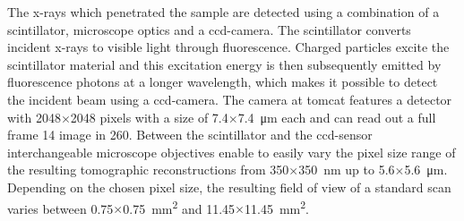 The x-rays which penetrated the sample are detected using a combination of a scintillator, microscope optics and a \ac{ccd}-camera. The scintillator converts incident x-rays to visible light through fluorescence. Charged particles excite the scintillator material and this excitation energy is then subsequently emitted by fluorescence photons at a longer wavelength, which  makes it possible to detect the incident beam using a \ac{ccd}-camera. The camera at \ac{tomcat} features a detector with 2048$\times$2048 pixels with a size of 7.4$\times$\SI{7.4}{\micro\meter} each and can read out a full frame \SI{14}{\bit} image in \SI{260}{\millisecond}. Between the scintillator and the \ac{ccd}-sensor interchangeable microscope objectives enable to easily vary the pixel size range of the resulting tomographic reconstructions from 350$\times$\SI{350}{\nano\meter} up to 5.6$\times$\SI{5.6}{\micro\meter}. Depending on the chosen pixel size, the resulting field of view of a standard scan varies between 0.75$\times$\SI{0.75}{\milli\meter\squared} and 11.45$\times$\SI{11.45}{\milli\meter\squared}.

